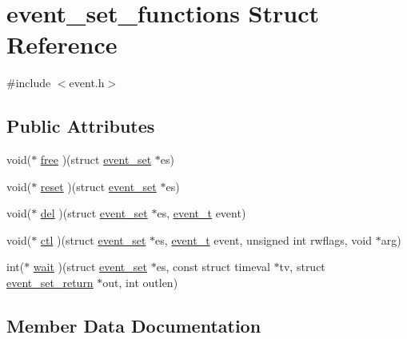 \hypertarget{structevent__set__functions}{}\section{event\+\_\+set\+\_\+functions Struct Reference}
\label{structevent__set__functions}


{\ttfamily \#include $<$event.\+h$>$}

\subsection*{Public Attributes}
\begin{DoxyCompactItemize}
\item 
void($\ast$ \hyperlink{structevent__set__functions_aabdea66ca4428093a3579a04832c01e0}{free} )(struct \hyperlink{structevent__set}{event\+\_\+set} $\ast$es)
\item 
void($\ast$ \hyperlink{structevent__set__functions_a88cad482b04e6f35f14be50c013ac0c4}{reset} )(struct \hyperlink{structevent__set}{event\+\_\+set} $\ast$es)
\item 
void($\ast$ \hyperlink{structevent__set__functions_a61638eee91067e2ba2c430cd35d87b07}{del} )(struct \hyperlink{structevent__set}{event\+\_\+set} $\ast$es, \hyperlink{event_8h_aaf06dbc1f07c15cb5e2779d3ec2dcb4b}{event\+\_\+t} event)
\item 
void($\ast$ \hyperlink{structevent__set__functions_a04026a627e687ab44459660bb5b6cfe3}{ctl} )(struct \hyperlink{structevent__set}{event\+\_\+set} $\ast$es, \hyperlink{event_8h_aaf06dbc1f07c15cb5e2779d3ec2dcb4b}{event\+\_\+t} event, unsigned int rwflags, void $\ast$arg)
\item 
int($\ast$ \hyperlink{structevent__set__functions_a348519d9f5634edcee292133e8544d4b}{wait} )(struct \hyperlink{structevent__set}{event\+\_\+set} $\ast$es, const struct timeval $\ast$tv, struct \hyperlink{structevent__set__return}{event\+\_\+set\+\_\+return} $\ast$out, int outlen)
\end{DoxyCompactItemize}


\subsection{Member Data Documentation}
\hypertarget{structevent__set__functions_a04026a627e687ab44459660bb5b6cfe3}{}
